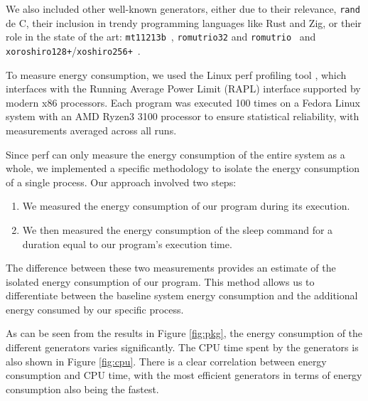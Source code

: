 \documentclass[dvipsnames,format=sigconf,anonymous=true,review=true]{acmart}
\begin{document}
We also included other well-known generators, either due to their relevance, \texttt{rand} de C, their inclusion in trendy programming languages like Rust and Zig, or their role in the state of the art: \texttt{mt11213b}~\cite{mersennetwister}, \texttt{romutrio32} and \texttt{romutrio}~\cite{overton2020romufastnonlinearpseudorandom} and \texttt{xoroshiro128+}/\-\texttt{xoshiro256+}~\cite{blackman2021scrambled}.

To measure energy consumption, we used the Linux perf profiling tool \cite{perf}, which interfaces with the Running Average Power Limit (RAPL) interface \cite{rapl} supported by modern x86 processors. Each program was executed 100 times on a Fedora Linux system with an AMD Ryzen3 3100 processor to ensure statistical reliability, with measurements averaged across all runs.

Since perf can only measure the energy consumption of the entire system as a whole, we implemented a specific methodology to isolate the energy consumption of a single process. Our approach involved two steps:

\begin{enumerate}
\item We measured the energy consumption of our program during its execution.
\item We then measured the energy consumption of the sleep command for a duration equal to our program's execution time.
\end{enumerate}

The difference between these two measurements provides an estimate of the isolated energy consumption of our program. This method allows us to differentiate between the baseline system energy consumption and the additional energy consumed by our specific process.

As can be seen from the results in Figure \ref{fig:pkg}, the energy consumption of the different generators varies significantly. The CPU time spent by the generators is also shown in Figure \ref{fig:cpu}. There is a clear correlation between energy consumption and CPU time, with the most efficient generators in terms of energy consumption also being the fastest.
\end{document}
